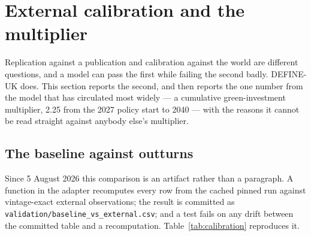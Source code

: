 \section{External calibration and the multiplier}
\label{sec:calibration}

Replication against a publication and calibration against the world are different questions, and a model can pass the first while failing the second badly. DEFINE-UK does. This section reports the second, and then reports the one number from the model that has circulated most widely --- a cumulative green-investment multiplier, 2.25 from the 2027 policy start to 2040 --- with the reasons it cannot be read straight against anybody else's multiplier.

\subsection{The baseline against outturns}

Since 5 August 2026 this comparison is an artifact rather than a paragraph. A function in the adapter recomputes every row from the cached pinned run against vintage-exact external observations; the result is committed as \texttt{validation/baseline\_vs\_external.csv}; and a test fails on any drift between the committed table and a recomputation. Table~\ref{tab:calibration} reproduces it.

